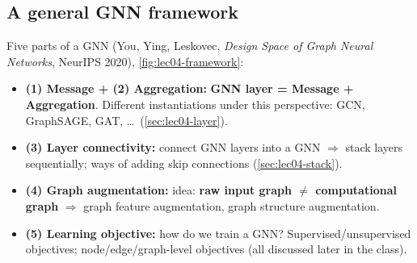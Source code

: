 \subsection{A general GNN framework}\label{sec:lec04-design}

Five parts of a GNN (You, Ying, Leskovec, \emph{Design Space of Graph Neural
Networks}, NeurIPS 2020), \cref{fig:lec04-framework}:
\begin{itemize}
  \item \textbf{(1) Message + (2) Aggregation:} \textbf{GNN layer = Message +
    Aggregation}. Different instantiations under this perspective: GCN,
    GraphSAGE, GAT, \dots\ (\cref{sec:lec04-layer}).
  \item \textbf{(3) Layer connectivity:} connect GNN layers into a GNN
    $\Rightarrow$ stack layers sequentially; ways of adding skip connections
    (\cref{sec:lec04-stack}).
  \item \textbf{(4) Graph augmentation:} idea: \textbf{raw input graph $\neq$
    computational graph} $\Rightarrow$ graph feature augmentation, graph
    structure augmentation.
  \item \textbf{(5) Learning objective:} how do we train a GNN?
    Supervised/unsupervised objectives; node/edge/graph-level objectives (all
    discussed later in the class).
\end{itemize}

